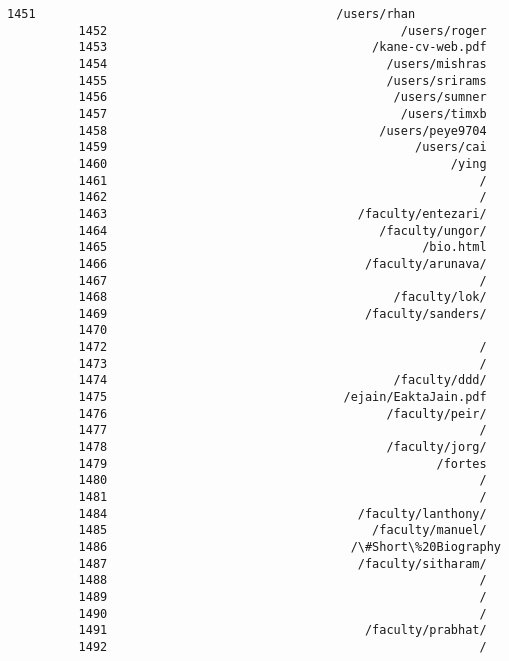 \documentclass[11pt]{article}
\begin{document}
\begin{Verbatim}[commandchars=\\\{\}]
          1451                                          /users/rhan
          1452                                         /users/roger
          1453                                     /kane-cv-web.pdf
          1454                                       /users/mishras
          1455                                       /users/srirams
          1456                                        /users/sumner
          1457                                         /users/timxb
          1458                                      /users/peye9704
          1459                                           /users/cai
          1460                                                /ying
          1461                                                    /
          1462                                                    /
          1463                                   /faculty/entezari/
          1464                                      /faculty/ungor/
          1465                                            /bio.html
          1466                                    /faculty/arunava/
          1467                                                    /
          1468                                        /faculty/lok/
          1469                                    /faculty/sanders/
          1470                                                     
          1472                                                    /
          1473                                                    /
          1474                                        /faculty/ddd/
          1475                                 /ejain/EaktaJain.pdf
          1476                                       /faculty/peir/
          1477                                                    /
          1478                                       /faculty/jorg/
          1479                                              /fortes
          1480                                                    /
          1481                                                    /
          1484                                   /faculty/lanthony/
          1485                                     /faculty/manuel/
          1486                                  /\#Short\%20Biography
          1487                                   /faculty/sitharam/
          1488                                                    /
          1489                                                    /
          1490                                                    /
          1491                                    /faculty/prabhat/
          1492                                                    /

\end{Verbatim}
\end{document}
